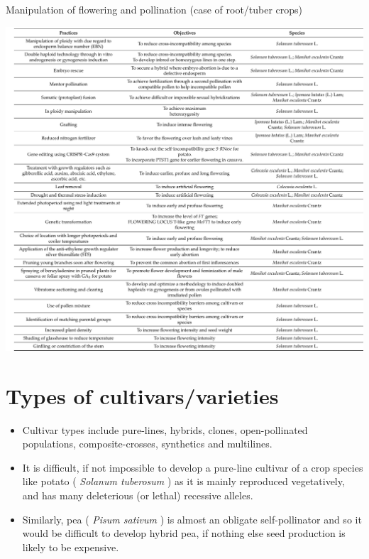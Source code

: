 \documentclass[11pt,ignorenonframetext,aspectratio=169]{beamer}
\providecommand{\tightlist}{%
  \setlength{\itemsep}{0pt}\setlength{\parskip}{0pt}}
\begin{document}
\begin{frame}{Manipulation of flowering and pollination (case of
root/tuber crops)}
\begin{center}\includegraphics[width=0.6\linewidth]{./images/pollination_control_root_tuber} \end{center}
\end{frame}

\hypertarget{types-of-cultivarsvarieties}{%
\section{Types of
cultivars/varieties}\label{types-of-cultivarsvarieties}}

\begin{frame}{}
\protect\hypertarget{section-20}{}
\begin{itemize}
\tightlist
\item
  Cultivar types include pure-lines, hybrids, clones, open-pollinated
  populations, composite-crosses, synthetics and multilines.
\item
  It is difficult, if not impossible to develop a pure-line cultivar of
  a crop species like potato ( \emph{Solanum tuberosum} ) as it is
  mainly reproduced vegetatively, and has many deleterious (or lethal)
  recessive alleles.
\item
  Similarly, pea ( \emph{Pisum sativum} ) is almost an obligate
  self-pollinator and so it would be difficult to develop hybrid pea, if
  nothing else seed production is likely to be expensive.
\end{itemize}
\end{frame}
\end{document}
